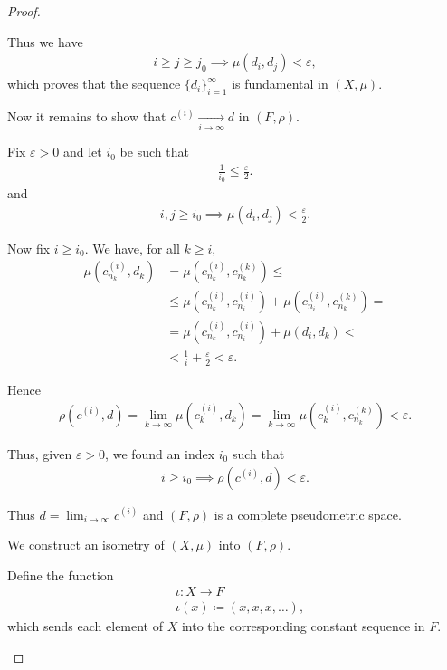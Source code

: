 \begin{proof}
\begin{defenum}
    Thus we have
    \begin{align*}
      i \geq j \geq j_0 \implies \mu(d_i, d_j) < \varepsilon,
    \end{align*}
    which proves that the sequence $\{ d_i \}_{i=1}^\infty$ is fundamental in $(X, \mu)$.

    Now it remains to show that $c^{(i)} \xrightarrow[i \to \infty]{} d$ in $(F, \rho)$.

    Fix $\varepsilon > 0$ and let $i_0$ be such that
    \begin{align*}
      \frac 1 {i_0} \leq \frac \varepsilon 2.
    \end{align*}
    and
    \begin{align*}
      i, j \geq i_0 \implies \mu(d_i, d_j) < \frac \varepsilon 2.
    \end{align*}

    Now fix $i \geq i_0$. We have, for all $k \geq i$,
    \begin{align*}
      \mu(c_{n_k}^{(i)}, d_k)
      &=
      \mu(c_{n_k}^{(i)}, c_{n_k}^{(k)})
      \leq \\ &\leq
      \mu(c_{n_k}^{(i)}, c_{n_i}^{(i)}) + \mu(c_{n_i}^{(i)}, c_{n_k}^{(k)})
      = \\ &=
      \mu(c_{n_k}^{(i)}, c_{n_i}^{(i)}) + \mu(d_i, d_k)
      < \\ &<
      \frac 1 i + \frac \varepsilon 2
      <
      \varepsilon.
    \end{align*}

    Hence
    \begin{align*}
      \rho(c^{(i)}, d)
      =
      \lim_{k \to \infty} \mu(c_k^{(i)}, d_k)
      =
      \lim_{k \to \infty} \mu(c_k^{(i)}, c_{n_k}^{(k)})
      <
      \varepsilon.
    \end{align*}

    Thus, given $\varepsilon > 0$, we found an index $i_0$ such that
    \begin{align*}
      i \geq i_0 \implies \rho(c^{(i)}, d) < \varepsilon.
    \end{align*}

    Thus $d = \lim_{i \to \infty} c^{(i)}$ and $(F, \rho)$ is a complete pseudometric space.

    \item\label{thm:metric_space_completion_existence/part_c} We construct an isometry of $(X, \mu)$ into $(F, \rho)$.

    Define the function
    \begin{align*}
      &\iota: X \to F \\
      &\iota(x) \coloneqq (x, x, x, \ldots),
    \end{align*}
    which sends each element of $X$ into the corresponding constant sequence in $F$.


\end{defenum}
\end{proof}
